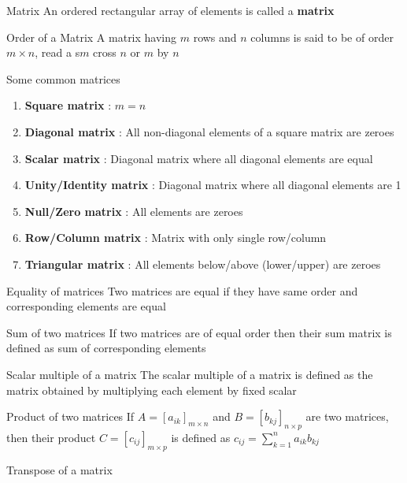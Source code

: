 \documentclass[titlepage, 12pt]{book}
\begin{document}
\begin{definition}{Matrix}{}
    An ordered rectangular array of elements is called a \textbf{matrix}
\end{definition}

\begin{definition}{Order of a Matrix}{}
    A matrix having $m$ rows and $n$ columns is said to be of order $m\times n$,
    read a s$m$ cross $n$ or $m$ by $n$
\end{definition}

Some common matrices
\begin{enumerate}
    \item\textbf{Square matrix} : $m = n$
    \item\textbf{Diagonal matrix} : All non-diagonal elements of a square matrix
        are zeroes
    \item\textbf{Scalar matrix} : Diagonal matrix where all diagonal elements
        are equal
    \item\textbf{Unity/Identity matrix} : Diagonal matrix where all diagonal
        elements are 1
    \item\textbf{Null/Zero matrix} : All elements are zeroes
    \item\textbf{Row/Column matrix} : Matrix with only single row/column
    \item\textbf{Triangular matrix} : All elements below/above (lower/upper) are
        zeroes
\end{enumerate}

\begin{definition}{Equality of matrices}{}
    Two matrices are equal if they have same order and corresponding elements
    are equal
\end{definition}

\begin{definition}{Sum of two matrices}{}
    If two matrices are of equal order then their sum matrix is defined as sum
    of corresponding elements
\end{definition}

\begin{definition}{Scalar multiple of a matrix}{}
    The scalar multiple of a matrix is defined as the matrix obtained by
    multiplying each element by fixed scalar
\end{definition}

\begin{definition}{Product of two matrices}{}
    If $A = [a_{ik}]_{m\times n}$ and $B = [b_{kj}]_{n\times p}$ are two
    matrices, then their product $C = [c_{ij}]_{m\times p}$ is defined as
    $c_{ij} = \sum_{k = 1}^n a_{ik}b_{kj}$
\end{definition}

\begin{definition}{Transpose of a matrix}{}
\end{definition}
\end{document}
